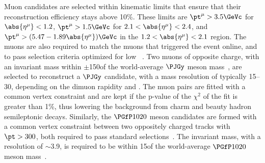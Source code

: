 \documentclass[11pt,twoside,a4paper,cmspaper]{cms-tdr}
\begin{document}
Muon candidates are selected within kinematic limits
that ensure that their reconstruction efficiency stays above 10\%. These limits are $\pt^{\mu}>3.5\GeVc$ for $\abs{\eta^{\mu}}<1.2$, $\pt^{\mu}>1.5\GeVc$ for $2.1<\abs{\eta^{\mu}}<2.4$, and $\pt^{\mu} >  (5.47 - 1.89 \abs{\eta^{\mu}}) \GeVc$ in the $1.2<\abs{\eta^{\mu}}<2.1$ region. The muons are also required to match the muons that triggered the event online, and to pass selection criteria optimized for low \pt ~\cite{Chatrchyan:2012xi}. %
Two muons of opposite charge, with an invariant mass within $\pm$150\MeVcc of the world-average $\PJGy$ meson mass~\cite{pdg2018}, are selected to reconstruct a $\PJGy$ candidate, with a mass resolution of typically 15--30\MeVcc, depending on the dimuon rapidity and \pt. The muon pairs are fitted with a common vertex constraint and are kept if the p-value of the $\chi^2$ of the fit is greater than 1\%, thus lowering the background from charm and beauty hadron semileptonic decays. 
Similarly, the $\Pphi$ meson candidates are formed with a common vertex constraint between two oppositely charged tracks with $\pt>300$\MeVc, both required to pass standard selections~\cite{Khachatryan:2016odn}. The invariant mass, with a resolution of $\sim$3.9\MeVcc, is required to be within 15\MeVcc of the world-average $\Pphi$ meson mass~\cite{pdg2018}.
\end{document}
